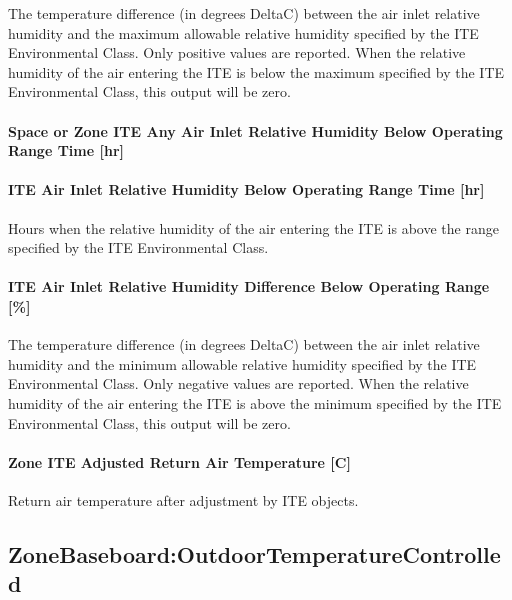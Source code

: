 The temperature difference (in degrees DeltaC) between the air inlet relative humidity and the maximum allowable relative humidity specified by the ITE Environmental Class. Only positive values are reported. When the relative humidity of the air entering the ITE is below the maximum specified by the ITE Environmental Class, this output will be zero.

\paragraph{Space or Zone ITE Any Air Inlet Relative Humidity Below Operating Range Time {[}hr{]}}\label{zone-ite-any-air-inlet-relative-humidity-below-operating-range-time-hr}

\paragraph{ITE Air Inlet Relative Humidity Below Operating Range Time {[}hr{]}}\label{ite-air-inlet-relative-humidity-below-operating-range-time-hr}

Hours when the relative humidity of the air entering the ITE is above the range specified by the ITE Environmental Class.

\paragraph{ITE Air Inlet Relative Humidity Difference Below Operating Range {[}\%{]}}\label{ite-air-inlet-relative-humidity-difference-below-operating-range}

The temperature difference (in degrees DeltaC) between the air inlet relative humidity and the minimum allowable relative humidity specified by the ITE Environmental Class. Only negative values are reported. When the relative humidity of the air entering the ITE is above the minimum specified by the ITE Environmental Class, this output will be zero.

\paragraph{Zone ITE Adjusted Return Air Temperature [C]}

Return air temperature after adjustment by ITE objects.

\subsection{ZoneBaseboard:OutdoorTemperatureControlled}\label{zonebaseboardoutdoortemperaturecontrolled}

